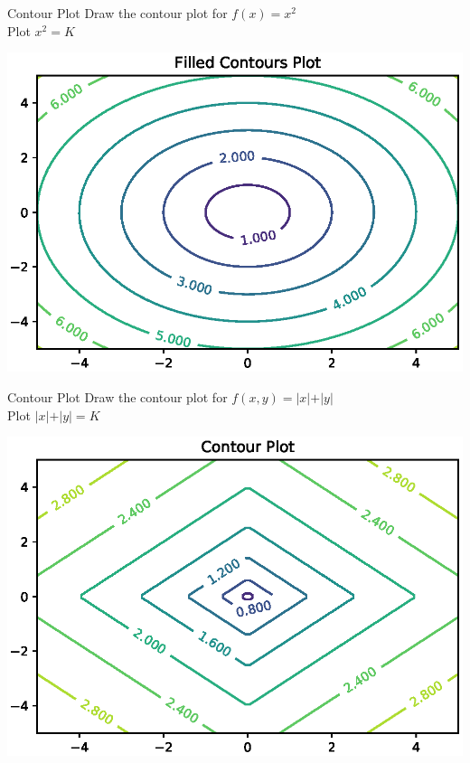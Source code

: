 \documentclass{beamer}
\begin{document}
\begin{frame}{Contour Plot}
    Draw the contour plot for $f(x) = x^{2}$\\
    Plot $x^{2}=K$
     \begin{center}
     \includegraphics[totalheight=6cm]{ml-maths/contour-plot-1.eps}
 \end{center}
 
\end{frame}








\begin{frame}{Contour Plot}
    Draw the contour plot for $f(x,y) = \vert x \vert + \vert y \vert $\\
    
    Plot $\vert x \vert + \vert y \vert = K$\\
     \begin{center}
     \includegraphics[totalheight=6cm]{ml-maths/contour-plot-3.eps}
 \end{center}
\end{frame}
\end{document}
